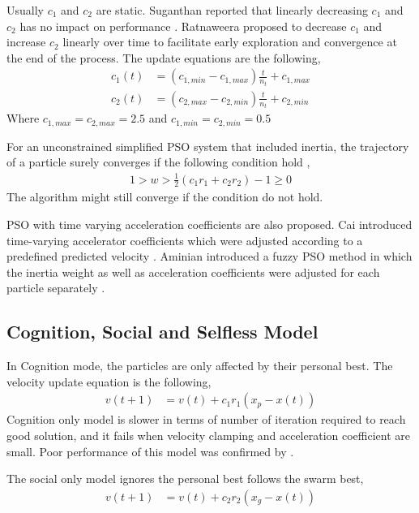 \documentclass{article}
\begin{document}
Usually $c_1$ and $c_2$ are static. Suganthan reported that linearly decreasing $c_1$ and $c_2$ has no impact on performance \cite{suganthan1999particle}. Ratnaweera proposed to decrease $c_1$ and increase $c_2$ linearly over time to facilitate early exploration and convergence at the end of the process. The update equations are the following,
\begin{align*}
c_1(t) &=  (c_{1,min} - c_{1, max}) \frac{t}{n_t} + c_{1, max} \\
c_2(t) &=  (c_{2,max} - c_{2, min}) \frac{t}{n_t} + c_{2, min} 
\end{align*}
Where $c_{1, max} = c_{2, max} = 2.5$ and $c_{1, min} = c_{2,min} = 0.5$

For an unconstrained simplified PSO system that included inertia, the trajectory of a particle surely converges if the following condition hold \cite{trelea2003particle},
\begin{align*}
1 > w > \frac{1}{2}(c_1 r_1 + c_2 r_2) -1 \ge 0
\end{align*}
The algorithm might still converge if the condition do not hold.

PSO with time varying acceleration coefficients are also proposed. Cai  introduced  time-varying accelerator coefficients which were adjusted according to a predefined predicted velocity \cite{cai2009predicted}. Aminian introduced a fuzzy PSO method in which the inertia weight as well as acceleration coefficients were adjusted for each particle separately \cite{aminian2013novel}.






\subsection{Cognition, Social and Selfless Model}
In Cognition mode, the particles are only affected by their personal best. The velocity update equation is the following,
\begin{align*}
v(t+1) &= v(t) + c_1r_1(x_p - x(t))
\end{align*}
Cognition only model is slower in terms of number of iteration required to reach good solution, and it fails when velocity clamping and acceleration coefficient are small. Poor performance of this model was confirmed by  \cite{carlisle2000adapting}.

The social only model ignores the personal best follows the swarm best,
\begin{align*}
v(t+1) &= v(t) + c_2r_2(x_g - x(t)) 
\end{align*}
\end{document}
